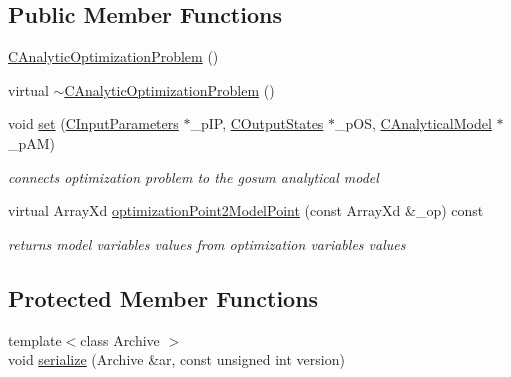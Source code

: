 \subsection*{Public Member Functions}
\begin{DoxyCompactItemize}
\item 
\hyperlink{class_go_s_u_m_1_1_c_analytic_optimization_problem_ad141d16c4846257bcfa527b7f2459f12}{C\-Analytic\-Optimization\-Problem} ()
\item 
virtual \hyperlink{class_go_s_u_m_1_1_c_analytic_optimization_problem_a19a323095890cc0082b2435865c8ab00}{$\sim$\-C\-Analytic\-Optimization\-Problem} ()
\item 
void \hyperlink{class_go_s_u_m_1_1_c_analytic_optimization_problem_a05a2653d1b361c207b52463f6a275f25}{set} (\hyperlink{class_go_s_u_m_1_1_c_input_parameters}{C\-Input\-Parameters} $\ast$\-\_\-p\-I\-P, \hyperlink{class_go_s_u_m_1_1_c_output_states}{C\-Output\-States} $\ast$\-\_\-p\-O\-S, \hyperlink{class_go_s_u_m_1_1_c_analytical_model}{C\-Analytical\-Model} $\ast$\-\_\-p\-A\-M)
\begin{DoxyCompactList}\small\item\em connects optimization problem to the gosum analytical model \end{DoxyCompactList}\item 
virtual Array\-Xd \hyperlink{class_go_s_u_m_1_1_c_analytic_optimization_problem_a4ffa4ac3b9915879ae60103596963ea4}{optimization\-Point2\-Model\-Point} (const Array\-Xd \&\-\_\-op) const 
\begin{DoxyCompactList}\small\item\em returns model variables values from optimization variables values \end{DoxyCompactList}\end{DoxyCompactItemize}
\subsection*{Protected Member Functions}
\begin{DoxyCompactItemize}
\item 
{\footnotesize template$<$class Archive $>$ }\\void \hyperlink{class_go_s_u_m_1_1_c_analytic_optimization_problem_a5b7ae760c7a619cef7733844638dd063}{serialize} (Archive \&ar, const unsigned int version)
\end{DoxyCompactItemize}
